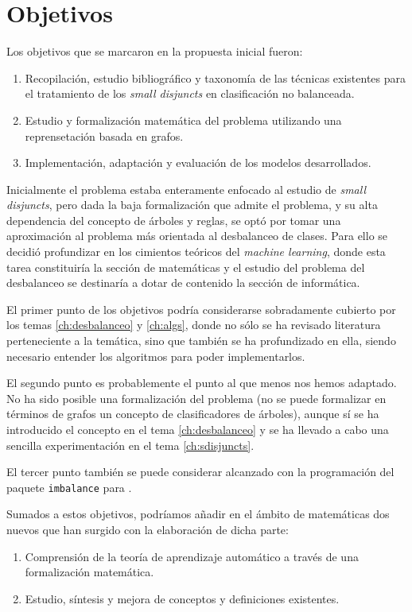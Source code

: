 \chapter{Objetivos}
Los objetivos que se marcaron en la propuesta inicial fueron:
\begin{enumerate}[i]
 \item Recopilación, estudio bibliográfico y taxonomía de las técnicas existentes para el tratamiento de los 
 \textit{small disjuncts} en clasificación no balanceada.
 \item Estudio y formalización matemática del problema utilizando una reprensetación basada en grafos.
 \item Implementación, adaptación y evaluación de los modelos desarrollados.
\end{enumerate}

Inicialmente el problema estaba enteramente enfocado al estudio de \textit{small disjuncts}, pero dada la baja formalización
que admite el problema, y su alta dependencia del concepto de árboles y reglas, se optó por tomar una aproximación 
al problema más orientada al desbalanceo de clases. Para ello se decidió profundizar en los cimientos
teóricos del \textit{machine learning}, donde esta tarea constituiría la sección de matemáticas y el estudio del problema
del desbalanceo se destinaría a dotar de contenido la sección de informática.

El primer punto de los objetivos podría considerarse sobradamente cubierto por los temas \ref{ch:desbalanceo} y 
\ref{ch:algs}, donde no sólo se ha revisado literatura perteneciente a la temática, sino que también se ha profundizado en
ella, siendo necesario entender los algoritmos para poder implementarlos.

El segundo punto es probablemente el punto al que menos nos hemos adaptado. No ha sido posible una formalización del problema
(no se puede formalizar en términos de grafos un concepto de clasificadores de árboles), aunque sí se ha introducido el
concepto en el tema \ref{ch:desbalanceo} y se ha llevado a cabo una sencilla experimentación en el tema \ref{ch:sdisjuncts}.

El tercer punto también se puede considerar alcanzado con la programación del paquete \texttt{imbalance} para \R.

Sumados a estos objetivos, podríamos añadir en el ámbito de matemáticas dos nuevos que han surgido con la elaboración de
dicha parte:
\begin{enumerate}[i]
 \item Comprensión de la teoría de aprendizaje automático a través de una formalización matemática.
 \item Estudio, síntesis y mejora de conceptos y definiciones existentes.
\end{enumerate}

